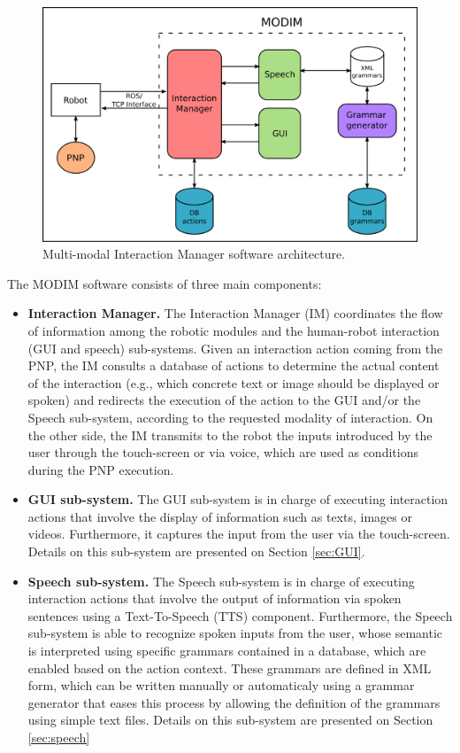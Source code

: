 \documentclass[11pt,a4paper]{article}
\begin{document}
\begin{figure}[!t]
\centering
\includegraphics[width=.6\columnwidth]{img/modim.png}
\caption{Multi-modal Interaction Manager software architecture.}
\label{fig:architecture}
\end{figure}

The MODIM software consists of three main components:
\begin{itemize}
\item \textbf{Interaction Manager.} The Interaction Manager (IM) coordinates the flow of information among the robotic modules and the human-robot interaction (GUI and speech) sub-systems. Given an interaction action coming from the PNP, the IM consults a database of actions to determine the actual content of the interaction (e.g., which concrete text or image should be displayed or spoken) and redirects the execution of the action to the GUI and/or the Speech sub-system, according to the requested modality of interaction. On the other side, the IM transmits to the robot the inputs introduced by the user through the touch-screen or via voice, which are used as conditions during the PNP execution.

\item \textbf{GUI sub-system.} The GUI sub-system is in charge of executing interaction actions that involve the display of information such as texts, images or videos. Furthermore, it captures the input from the user via the touch-screen.
Details on this sub-system are presented on Section \ref{sec:GUI}.
\item \textbf{Speech sub-system.} The Speech sub-system is in charge of executing interaction actions that involve the output of information via spoken sentences using a Text-To-Speech (TTS) component. Furthermore, the Speech sub-system is able to recognize spoken inputs from the user, whose semantic is interpreted using specific grammars contained in a database, which are enabled based on the action context. These grammars are defined in XML form, which can be written manually or automaticaly using a grammar generator that eases this process by allowing the definition of the grammars using simple text files.
Details on this sub-system are presented on Section \ref{sec:speech}
\end{itemize}
\end{document}
